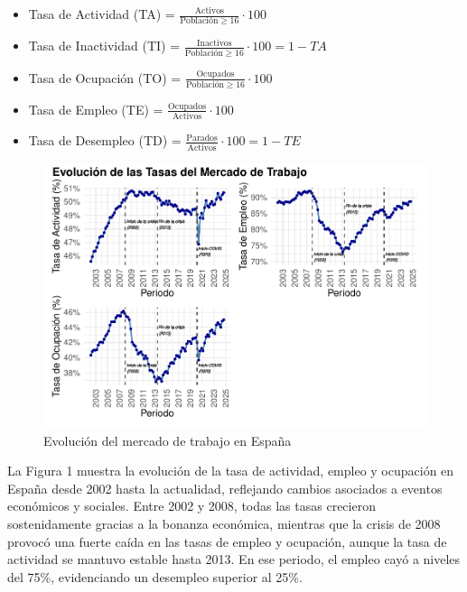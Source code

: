 \documentclass[Universitat de
València,article,submit,moreauthors,pdftex]{Definitions/mdpi}
\begin{document}
\begin{itemize}
\item
  Tasa de Actividad (TA) =
  \(\frac{\text{Activos}}{\text{Población} \geq 16}\cdot100\)
\item
  Tasa de Inactividad (TI) =
  \(\frac{\text{Inactivos}}{\text{Población} \geq 16}\cdot100 = 1 - TA\)
\item
  Tasa de Ocupación (TO) =
  \(\frac{\text{Ocupados}}{\text{Población} \geq 16}\cdot100\)
\item
  Tasa de Empleo (TE) =
  \(\frac{\text{Ocupados}}{\text{Activos}}\cdot100\)
\item
  Tasa de Desempleo (TD) =
  \(\frac{\text{Parados}}{\text{Activos}}\cdot100 = 1 - TE\)
\end{itemize}

\begin{figure}[h]

{\centering \includegraphics[width=1\linewidth]{ProyectoAED2024_files/figure-latex/unnamed-chunk-26-1} 

}

\caption{Evolución del mercado de trabajo en España}\label{fig:unnamed-chunk-26}
\end{figure}

La Figura 1 muestra la evolución de la tasa de actividad, empleo y
ocupación en España desde 2002 hasta la actualidad, reflejando cambios
asociados a eventos económicos y sociales. Entre 2002 y 2008, todas las
tasas crecieron sostenidamente gracias a la bonanza económica, mientras
que la crisis de 2008 provocó una fuerte caída en las tasas de empleo y
ocupación, aunque la tasa de actividad se mantuvo estable hasta 2013. En
ese periodo, el empleo cayó a niveles del 75\%, evidenciando un
desempleo superior al 25\%.
\end{document}
